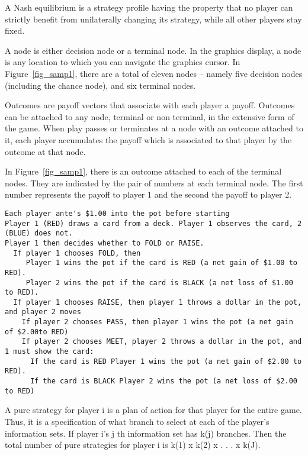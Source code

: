 {\begin{helpglossary}
\label{nashequigloss}
A Nash equilibrium is a strategy profile having the property that no player 
can strictly benefit from unilaterally changing its strategy, while all 
other players stay fixed.  

\label{nodegloss}
A node is either decision node or a terminal node.  In the graphics 
display, a node is any location to which you can navigate the graphics 
cursor. In Figure~\ref{fig_samp1}, there are a total of eleven nodes -- namely 
five decision nodes (including the chance node), and six terminal nodes.  

\label{outcomegloss}
Outcomes are payoff vectors that associate with each player a payoff.  
Outcomes can be attached to any node, terminal or non terminal, in the 
extensive form of the game.  When play passes or terminates at a node 
with an outcome attached to it, each player accumulates the payoff which 
is associated to that player by the outcome at that node. 

In Figure~\ref{fig_samp1}, there is an outcome attached to each of the
terminal nodes.  They are indicated by the pair of numbers at each
terminal node.  The first number represents the payoff to player 1 and the
second the payoff to player 2.

\label{pokergloss}
\begin{verbatim} 
Each player ante's $1.00 into the pot before starting
Player 1 (RED) draws a card from a deck. Player 1 observes the card, 2 (BLUE) does not. 
Player 1 then decides whether to FOLD or RAISE. 
  If player 1 chooses FOLD, then 
     Player 1 wins the pot if the card is RED (a net gain of $1.00 to RED).
     Player 2 wins the pot if the card is BLACK (a net loss of $1.00 to RED).
  If player 1 chooses RAISE, then player 1 throws a dollar in the pot, and player 2 moves
    If player 2 chooses PASS, then player 1 wins the pot (a net gain of $2.00to RED)
    If player 2 chooses MEET, player 2 throws a dollar in the pot, and 1 must show the card: 
      If the card is RED Player 1 wins the pot (a net gain of $2.00 to RED).
      If the card is BLACK Player 2 wins the pot (a net loss of $2.00 to RED)
\end{verbatim}

\label{purestratgloss} 
A pure strategy for player i is a plan of action for that player for the 
entire game.  Thus, it is a specification of what branch to select at each 
of the player's information sets.  If player i's j th information set has 
k(j) branches.  Then the total number of pure strategies for player i is 
k(1) x k(2) x . . . x k(J).


\end{helpglossary}}
